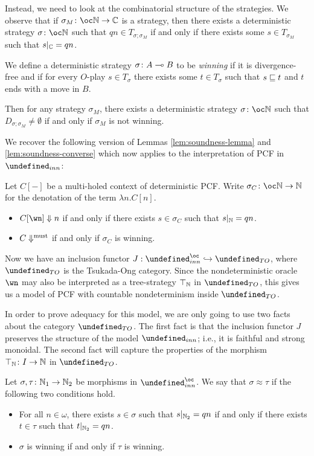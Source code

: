 \documentclass[sigplan,9pt,review]{acmart}\settopmatter{printfolios=true,printccs=false,printacmref=false}
\let\G\undefined
\begin{document}
Instead, we need to look at the combinatorial structure of the strategies.  
We observe that if $\sigma_M\from\oc\bN\to\bC$ is a strategy, then there exists a deterministic strategy $\sigma\from\oc\bN$ such that $qn\in T_{\sigma;\sigma_M}$ if and only if there exists some $s\in T_{\sigma_M}$ such that $s\vert_{\mathbb{C}}=qn$.  

We define a deterministic strategy $\sigma\colon A \multimap B$ to be \emph{winning} if it is divergence-free and if for every $O$-play $s\in T_\sigma$ there exists some $t\in T_\sigma$ such that $s\sqsubseteq t$ and $t$ ends with a move in $B$.  

Then for any strategy $\sigma_M$, there exists a deterministic strategy $\sigma\from\oc\bN$ such that $D_{\sigma;\sigma_M}\ne\emptyset$ if and only if $\sigma_M$ is not winning.

We recover the following version of Lemmas \ref{lem:soundness-lemma} and \ref{lem:soundness-converse} which now applies to the interpretation of PCF in $\G_{inn}$:
\begin{lemma}
  Let $C[-]$ be a multi-holed context of deterministic PCF.
  Write $\sigma_C\from\oc\bN\to\bN$ for the denotation of the term $\lambda n.C[n]$.  
  \begin{itemize}
    \item $C[\wn]\converges n$ if and only if there exists $s\in \sigma_C$ such that $s\vert_{\mathbb{N}}=qn$.  
    \item $C\Downarrow^{\text{must}}$ if and only if $\sigma_C$ is winning.
  \end{itemize}
  \label{lem:pcf-soundness-lemma}
\end{lemma}

Now we have an inclusion functor $J:\G_{inn}^\oc\hookrightarrow\G_{TO}$, where $\G_{TO}$ is the Tsukada-Ong category.  
Since the nondeterministic oracle $\wn$ may also be interpreted as a tree-strategy $\top_{\mathbb{N}}$ in $\G_{TO}$, this gives us a model of PCF with countable nondeterminism inside $\G_{TO}$.

In order to prove adequacy for this model, we are only going to use two facts about the category $\G_{TO}$.  
The first fact is that the inclusion functor $J$ preserves the structure of the model $\G_{inn}$; i.e., it is faithful and strong monoidal.  
The second fact will capture the properties of the morphism $\top_{\mathbb{N}}\colon I \to \mathbb{N}$ in $\G_{TO}$.  

\begin{definition}
  Let $\sigma,\tau\colon\mathbb{N}_1\to\mathbb{N}_2$ be morphisms in $\G_{inn}^\oc$.  
  We say that $\sigma\approx\tau$ if the following two conditions hold.
  \begin{itemize}
    \item For all $n\in\omega$, there exists $s\in\sigma$ such that $s\vert_{\mathbb{N}_2}=qn$ if and only if there exists $t\in\tau$ such that $t\vert_{\mathbb{N}_2}=qn$.  
    \item $\sigma$ is winning if and only if $\tau$ is winning.
  \end{itemize}
\end{definition}
\end{document}
